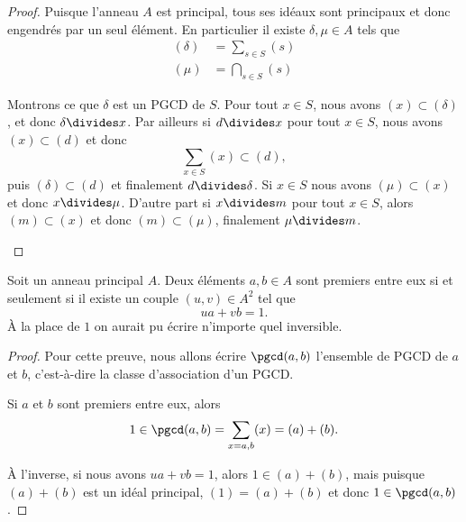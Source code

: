\begin{proof}
	Puisque l'anneau \( A\) est principal, tous ses idéaux sont principaux et donc engendrés par un seul élément. En particulier il existe \( \delta,\mu\in A\) tels que
	\begin{subequations}
		\begin{align}
			(\delta) & =  \sum_{s\in S}(s)    \\
			(\mu)    & =  \bigcap_{s\in S}(s)
		\end{align}
	\end{subequations}
	\begin{subproof}
		\spitem[PGCD]
		Montrons ce que \( \delta\) est un PGCD de \( S\). Pour tout \( x\in S\), nous avons \( (x)\subset (\delta)\), et donc \( \delta\divides x\). Par ailleurs si \( d\divides x\) pour tout \( x\in S\), nous avons \( (x)\subset (d)\) et donc
		\begin{equation}
			\sum_{x\in S}(x)\subset (d),
		\end{equation}
		puis \( (\delta)\subset (d)\) et finalement \( d\divides \delta\).
		\spitem[PPCM]
		Si \( x\in S\) nous avons \( (\mu)\subset (x)\) et donc \( x\divides \mu\). D'autre part si \( x\divides m\) pour tout \( x\in S\), alors \( (m)\subset (x)\) et donc \( (m)\subset(\mu)\), finalement \( \mu\divides m\).
	\end{subproof}
\end{proof}

\begin{corollary}\label{CorimHyXy}
	Soit un anneau principal \( A\). Deux éléments \( a,b\in A\) sont premiers entre eux si et seulement si il existe un couple \( (u, v)\in A^2 \) tel que
	\begin{equation}
		ua+vb=1.
	\end{equation}
	À la place de \( 1\) on aurait pu écrire n'importe quel inversible.
\end{corollary}

\begin{proof}
	Pour cette preuve, nous allons écrire \( \pgcd(a,b)\) l'ensemble de PGCD de \( a\) et \( b\), c'est-à-dire la classe d'association d'un PGCD.

	Si \( a\) et \( b\) sont premiers entre eux, alors
	\begin{equation}
		1\in\pgcd(a,b)=\sum_{x=a,b}(x)=(a)+(b).
	\end{equation}

	À l'inverse, si nous avons \( ua+vb=1\), alors \( 1\in (a)+(b)\), mais puisque \( (a)+(b)\) est un idéal principal, \( (1)=(a)+(b)\) et donc \( 1\in \pgcd(a,b)\).
\end{proof}

